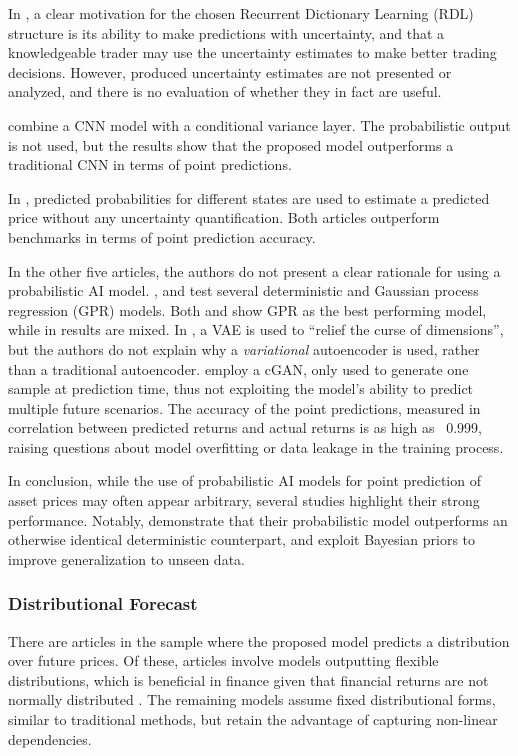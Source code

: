 In \textcite{Sharma2021}, a clear motivation for the chosen Recurrent Dictionary Learning (RDL) structure is its ability to make predictions with uncertainty, and that a knowledgeable trader may use the uncertainty estimates to make better trading decisions. However, produced uncertainty estimates are not presented or analyzed, and there is no evaluation of whether they in fact are useful.

\textcite{Daniali2021} combine a CNN model with a conditional variance layer. The probabilistic output is not used, but the results show that the proposed model outperforms a traditional CNN in terms of point predictions.

In \textcite{govindasamy2014prediction, li2010stochastic}, predicted probabilities for different states are used to estimate a predicted price without any uncertainty quantification. Both articles outperform benchmarks in terms of point prediction accuracy.

In the other five articles, the authors do not present a clear rationale for using a probabilistic AI model. \textcite{Zmuk2020gpr}, \textcite{Park2014gpr} and \textcite{Papaioannou2022gpr} test several deterministic and Gaussian process regression (GPR) models. Both \textcite{Park2014gpr} and \textcite{Papaioannou2022gpr} show GPR as the best performing model, while in \textcite{Zmuk2020gpr} results are mixed. In \textcite{li2020multivariate}, a VAE is used to ``relief the curse of dimensions'', but the authors do not explain why a \textit{variational} autoencoder is used, rather than a traditional autoencoder. \textcite{salama2024gan} employ a cGAN, only used to generate one sample at prediction time, thus not exploiting the model's ability to predict multiple future scenarios. The accuracy of the point predictions, measured in correlation between predicted returns and actual returns is as high as ~0.999, raising questions about model overfitting or data leakage in the training process.

In conclusion, while the use of probabilistic AI models for point prediction of asset prices may often appear arbitrary, several studies highlight their strong performance. Notably, \textcite{Daniali2021} demonstrate that their probabilistic model outperforms an otherwise identical deterministic counterpart, and \textcite{jang2018generative} exploit Bayesian priors to improve generalization to unseen data.

\subsubsection{Distributional Forecast}
\label{sec:distribution}
There are \distributionaloutput articles in the sample where the proposed model predicts a distribution over future prices. Of these, \distributionalparametric articles involve models outputting flexible distributions, which is beneficial in finance given that financial returns are not normally distributed \parencite{Peir1994TheDO}. The remaining \distributionalnonparametric models assume fixed distributional forms, similar to traditional methods, but retain the advantage of capturing non-linear dependencies.

